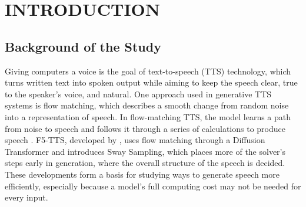 
\section{INTRODUCTION}
\label{sec:intro}


\subsection{Background of the Study}
\label{sec:background}

Giving computers a voice is the goal of text-to-speech (TTS) technology, which turns written text into spoken output while aiming to keep the speech clear, true to the speaker's voice, and natural. One approach used in generative TTS systems is flow matching, which describes a smooth change from random noise into a representation of speech. In flow-matching TTS, the model learns a path from noise to speech and follows it through a series of calculations to produce speech \parencite{lipman2023flow,liu2023flow}. F5-TTS, developed by \textcite{chen2024f5}, uses flow matching through a Diffusion Transformer and introduces Sway Sampling, which places more of the solver's steps early in generation, where the overall structure of the speech is decided. These developments form a basis for studying ways to generate speech more efficiently, especially because a model's full computing cost may not be needed for every input.

